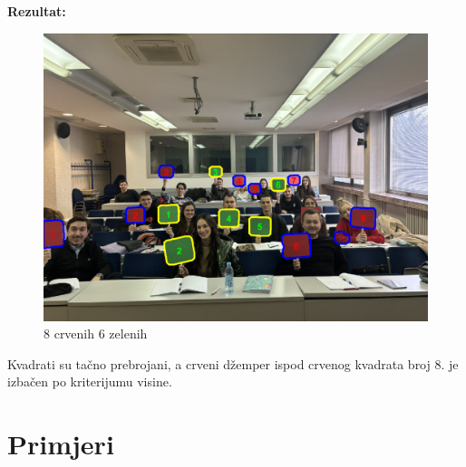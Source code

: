 \documentclass[a4paper,12pt]{article}
\begin{document}

\newpage
\textbf{Rezultat:}

\begin{figure}[h]
    \centering
    \includegraphics[width=\textwidth]{img/studenti.png}
    \caption{8 crvenih 6 zelenih}
    \label{fig:example}
\end{figure}

Kvadrati su tačno prebrojani, a crveni džemper ispod crvenog kvadrata broj 8. je izbačen po kriterijumu visine.

\newpage
\section{Primjeri}
\end{document}
